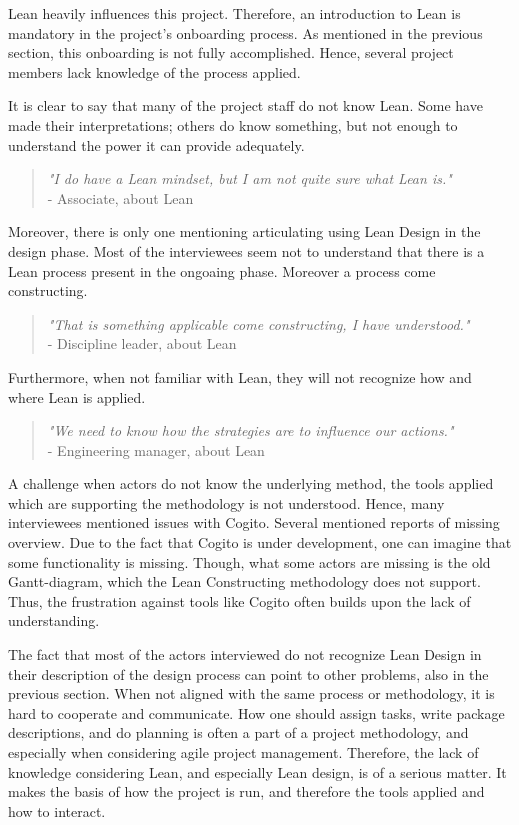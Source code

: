 Lean heavily influences this project. Therefore, an introduction to Lean is mandatory in the project's onboarding process. As mentioned in the previous section, this onboarding is not fully accomplished. Hence, several project members lack knowledge of the process applied. 

It is clear to say that many of the project staff do not know Lean. Some have made their interpretations; others do know something, but not enough to understand the power it can provide adequately.  

\begin{quote}
    \textit{"I do have a Lean mindset, but I am not quite sure what Lean is."} \\
    - Associate, about Lean 
\end{quote}

Moreover, there is only one mentioning articulating using Lean Design in the design phase. Most of the interviewees seem not to understand that there is a Lean process present in the ongoaing phase. Moreover a process come constructing. 

\begin{quote}
    \textit{"That is something applicable come constructing, I have understood."} \\
    - Discipline leader, about Lean
\end{quote}

Furthermore, when not familiar with Lean, they will not recognize how and where Lean is applied.

\begin{quote}
    \textit{"We need to know how the strategies are to influence our actions."} \\
    - Engineering manager, about Lean
\end{quote}

A challenge when actors do not know the underlying method, the tools applied which are supporting the methodology is not understood. Hence,  many interviewees mentioned issues with Cogito. Several mentioned reports of missing overview. Due to the fact that Cogito is under development, one can imagine that some functionality is missing. Though,  what some actors are missing is the old Gantt-diagram, which the Lean Constructing methodology does not support. Thus, the frustration against tools like Cogito often builds upon the lack of understanding. 

The fact that most of the actors interviewed do not recognize Lean Design in their description of the design process can point to other problems, also in the previous section. When not aligned with the same process or methodology, it is hard to cooperate and communicate. How one should assign tasks, write package descriptions, and do planning is often a part of a project methodology, and especially when considering agile project management. Therefore, the lack of knowledge considering Lean, and especially Lean design, is of a serious matter. It makes the basis of how the project is run, and therefore the tools applied and how to interact.

